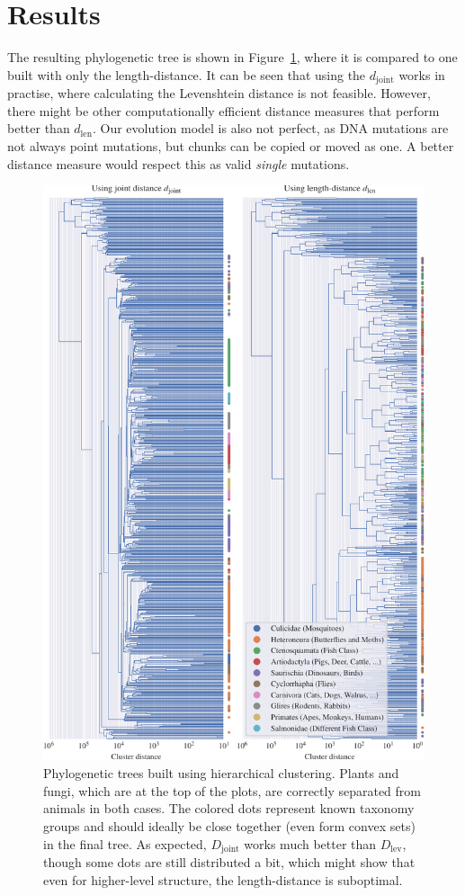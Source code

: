 \documentclass{article}
\begin{document}
\section{Results}
The resulting phylogenetic tree is shown in Figure~\ref{fig:dendro}, where it is compared to one built with only the length-distance. It can be seen that using the $d_\mathrm{joint}$ works in practise, where calculating the Levenshtein distance is not feasible. However, there might be other computationally efficient distance measures that perform better than $d_\mathrm{len}$. Our evolution model is also not perfect, as DNA mutations are not always point mutations, but chunks can be copied or moved as one. A better distance measure would respect this as valid \emph{single} mutations.

\printbibliography

\begin{figure}[htbp]
    \centering
    \includegraphics{dendrogram.pdf}
    \caption{Phylogenetic trees built using hierarchical clustering. Plants and fungi, which are at the top of the plots, are correctly separated from animals in both cases. The colored dots represent known taxonomy groups and should ideally be close together (even form convex sets) in the final tree. As expected, $D_\mathrm{joint}$ works much better than $D_\mathrm{lev}$, though some dots are still distributed a bit, which might show that even for higher-level structure, the length-distance is suboptimal.}
    \label{fig:dendro}
\end{figure}
\end{document}
